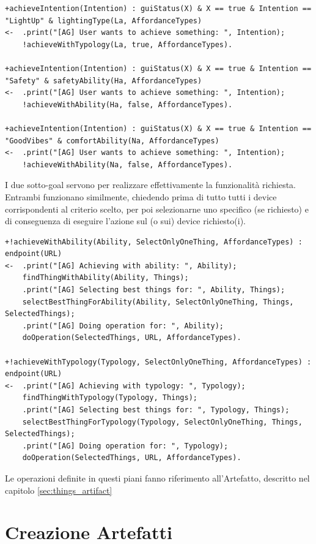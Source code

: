 \documentclass[12pt,a4paper,openright,oneside]{report}
\begin{document}
\begin{lstlisting}
+achieveIntention(Intention) : guiStatus(X) & X == true & Intention == "LightUp" & lightingType(La, AffordanceTypes)
<-  .print("[AG] User wants to achieve something: ", Intention);
	!achieveWithTypology(La, true, AffordanceTypes).

+achieveIntention(Intention) : guiStatus(X) & X == true & Intention == "Safety" & safetyAbility(Ha, AffordanceTypes)
<-  .print("[AG] User wants to achieve something: ", Intention);
	!achieveWithAbility(Ha, false, AffordanceTypes).

+achieveIntention(Intention) : guiStatus(X) & X == true & Intention == "GoodVibes" & comfortAbility(Na, AffordanceTypes)
<-  .print("[AG] User wants to achieve something: ", Intention);
	!achieveWithAbility(Na, false, AffordanceTypes).
\end{lstlisting}

I due sotto-goal servono per realizzare effettivamente la funzionalità richiesta. Entrambi funzionano similmente, chiedendo prima di tutto tutti i device corrispondenti al criterio scelto, per poi selezionarne uno specifico (se richiesto) e di conseguenza di eseguire l'azione sul (o sui) device richiesto(i).

\begin{lstlisting}
+!achieveWithAbility(Ability, SelectOnlyOneThing, AffordanceTypes) : endpoint(URL)
<-  .print("[AG] Achieving with ability: ", Ability);
	findThingWithAbility(Ability, Things);
	.print("[AG] Selecting best things for: ", Ability, Things);
	selectBestThingForAbility(Ability, SelectOnlyOneThing, Things, SelectedThings);
	.print("[AG] Doing operation for: ", Ability);
	doOperation(SelectedThings, URL, AffordanceTypes).

+!achieveWithTypology(Typology, SelectOnlyOneThing, AffordanceTypes) : endpoint(URL)
<-  .print("[AG] Achieving with typology: ", Typology);
	findThingWithTypology(Typology, Things);
	.print("[AG] Selecting best things for: ", Typology, Things);
	selectBestThingForTypology(Typology, SelectOnlyOneThing, Things, SelectedThings);
	.print("[AG] Doing operation for: ", Typology);
	doOperation(SelectedThings, URL, AffordanceTypes).
\end{lstlisting}

Le operazioni definite in questi piani fanno riferimento all'Artefatto, descritto nel capitolo \ref{sec:things_artifact}

\section{Creazione Artefatti}
\end{document}
